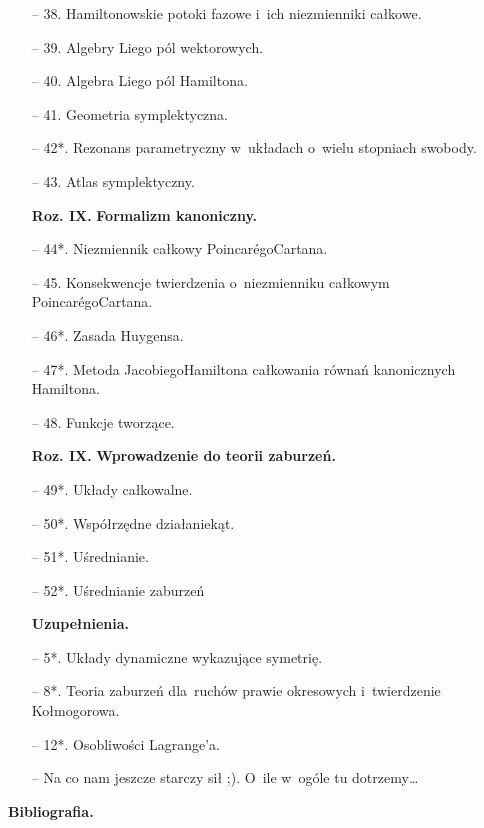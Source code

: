 \documentclass[a4paper,11pt]{article}
\begin{document}
\begin{itemize}
\item[--] 38. Hamiltonowskie potoki fazowe i~ich niezmienniki całkowe.
\item[--] 39. Algebry Liego pól wektorowych.
\item[--] 40. Algebra Liego pól Hamiltona.
\item[--] 41. Geometria symplektyczna.
\item[--] 42*. Rezonans parametryczny w~układach o~wielu stopniach
  swobody.
\item[--] 43. Atlas symplektyczny.
\item[\textbf{Roz. IX.}] \textbf{Formalizm kanoniczny.}
\item[--] 44*. Niezmiennik całkowy Poincar\'{e}go\dywiz Cartana.
\item[--] 45. Konsekwencje twierdzenia o~niezmienniku całkowym
  Poincar\'{e}go\dywiz Cartana.
\item[--] 46*. Zasada Huygensa.
\item[--] 47*. Metoda Jacobiego\dywiz Hamiltona całkowania równań
  kanonicznych Hamiltona.
\item[--] 48. Funkcje tworzące.
\item[\textbf{Roz. IX.}] \textbf{Wprowadzenie do teorii zaburzeń.}
\item[--] 49*. Układy całkowalne.
\item[--] 50*. Współrzędne działanie\dywiz kąt.
\item[--] 51*. Uśrednianie.
\item[--] 52*. Uśrednianie zaburzeń
\item[] \textbf{Uzupełnienia.}
\item[--] 5*. Układy dynamiczne wykazujące symetrię.
\item[--] 8*. Teoria zaburzeń dla~ruchów prawie okresowych
  i~twierdzenie Kołmogorowa.
\item[--] 12*. Osobliwości Lagrange'a.
\item[--] Na co nam jeszcze starczy sił ;). O~ile w~ogóle tu
  dotrzemy\ldots
\end{itemize}

\begin{center}
  \Large{\textbf{Bibliografia.}}
\end{center}
\end{document}
